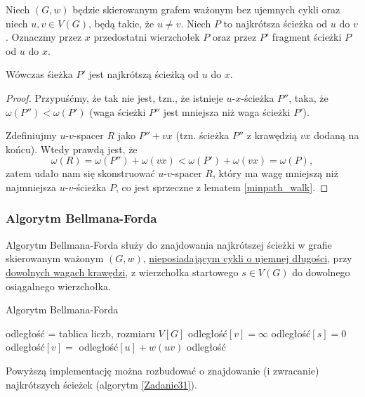 \begin{lemma}
	Niech $(G, w)$ będzie skierowanym grafem ważonym
	bez ujemnych cykli oraz niech $u, v \in V(G)$,
	będą takie, że $u \not = v$. Niech $P$ to 
	najkrótsza ścieżka od $u$ do $v$. Oznaczmy przez
	$x$ przedostatni wierzchołek $P$ oraz 
	przez $P'$ fragment ścieżki $P$ od $u$ do $x$.
	
	Wówczas śieżka $P'$ jest najkrótszą ścieżką od $u$ do 
	$x$.
	
	\begin{proof}
		Przypuśćmy, że tak nie jest, tzn., że istnieje 
		$u$-$x$-ścieżka $P''$, taka, że 
		$\omega(P'') < \omega(P')$ (waga ścieżki $P''$
		jest mniejsza niż waga ścieżki $P'$).
		
		Zdefiniujmy $u$-$v$-spacer $R$ jako $P'' + vx$
		(tzn. ścieżka $P''$ z krawędzią $vx$ 
		dodaną na końcu). Wtedy prawdą jest, że
		\[\omega(R) = \omega(P'') + \omega(vx) <
		\omega(P') + \omega(vx) = \omega(P),\]
		zatem udało nam się skonstruować 
		$u$-$v$-spacer $R$, który ma wagę mniejszą niż
		najmniejsza $u$-$v$-ścieżka $P$, co 
		jest sprzeczne z lematem \ref{minpath_walk}.
	\end{proof}
	\label{minpath_subpath}
\end{lemma}
\subsubsection{Algorytm Bellmana-Forda}
Algorytm Bellmana-Forda służy do znajdowania 
najkrótszej ścieżki w grafie skierowanym ważonym $(G, w)$,
\underline{nieposiadającym cykli o ujemnej długości}, przy 
\underline{dowolnych wagach krawędzi}, 
z wierzchołka startowego $s \in V(G)$
do dowolnego osiągalnego wierzchołka.

\begin{algorithm}[H]
	\caption{Algorytm Bellmana-Forda}\label{bellmanford_alg}
	\begin{algorithmic}[1]
		\State odległość = tablica liczb, rozmiaru $V[G]$
		\State odległość$[v]=\infty$
		\EndFor
		\State odległość$[s]=0$
		\State odległość$[v]=$ odległość$[u] + w(uv)$ 
		\EndIf
		\EndFor
		\EndFor
		\State \Return odległość
		\EndProcedure
	\end{algorithmic}
	\label{bellman_ford}
\end{algorithm}
Powyższą implementację można rozbudować o
znajdowanie (i zwracanie) najkrótszych ścieżek
(algorytm \ref{Zadanie31}).

